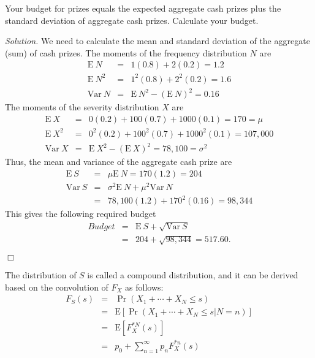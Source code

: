 \documentclass[12pt,letterpaper]{article}
\begin{document}
\noindent Your budget for prizes equals the expected aggregate cash prizes plus the standard deviation of aggregate cash prizes. Calculate your budget.

\bigskip

\noindent \textit{Solution.} We need to calculate the mean and standard deviation of the aggregate (sum) of cash prizes. The moments of the frequency distribution $N$ are
\begin{eqnarray*}
\mathrm{E~}N &=& 1 (0.8) + 2 (0.2) =1.2\\
\mathrm{E~}N^2 &=&  1^2 (0.8) + 2^2 (0.2) =1.6\\
\mathrm{Var~}N &=& \mathrm{E~}N^2 - \left( \mathrm{E~}N \right)^2= 0.16
\end{eqnarray*}
The moments of the severity distribution $X$ are
\begin{eqnarray*}
\mathrm{E~}X &=& 0 (0.2) + 100 (0.7) + 1000 (0.1) = 170 = \mu\\
\mathrm{E~}X^2 &=& 0^2 (0.2) + 100^2 (0.7) + 1000^2 (0.1) = 107,000\\
\mathrm{Var~}X &=& \mathrm{E~}X^2 - \left( \mathrm{E~}X \right)^2=78,100 = \sigma^2
\end{eqnarray*}
Thus, the mean and variance of the aggregate cash prize are
\begin{eqnarray*}
\mathrm{E~}S  &=& \mu \mathrm{E~}N = 170 (1.2) = 204 \\
\mathrm{Var~}S &=& \sigma^2 \mathrm{E~}N + \mu^2 \mathrm{Var~}N\\
&=& 78,100 (1.2) + 170^2 (0.16) = 98,344
\end{eqnarray*}
This gives the following required budget
\begin{eqnarray*}
Budget &=& \mathrm{E~}S + \sqrt{\mathrm{Var~}S} \\
&=& 204 + \sqrt{98,344} = 517.60 .
\end{eqnarray*}
\begin{flushright}$\Box$\end{flushright}


The distribution of $S$ is called a compound distribution, and it can be derived based on the convolution of $F_X$ as follows:
\begin{eqnarray*}
F_{S}(s) &=& \Pr \left(X_1 + \cdots + X_N \le s \right) \\
&=&  \mathrm{E} \left[ \Pr \left(X_1 + \cdots + X_N  \le s|N=n \right) \right]\\
&=&  \mathrm{E} \left[ F_{X}^{\ast N}(s) \right] \\
&=&  p_0 + \sum_{n=1}^{\infty }p_n F_{X}^{\ast n}(s)
\end{eqnarray*}
\end{document}
